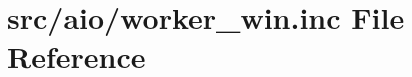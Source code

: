 \hypertarget{worker__win_8inc}{}\section{src/aio/worker\+\_\+win.inc File Reference}
\label{worker__win_8inc}
